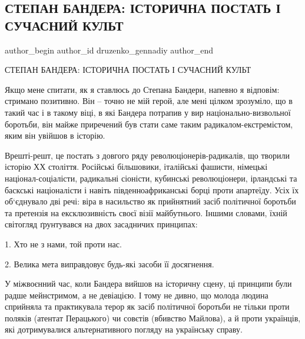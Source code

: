  
 
 
 
 
 
\subsection{СТЕПАН БАНДЕРА: ІСТОРИЧНА ПОСТАТЬ І СУЧАСНИЙ КУЛЬТ}
\label{sec:02_01_2022.fb.druzenko_gennadiy.1.bandera}
 
\ifcmt
 author_begin
   author_id druzenko_gennadiy
 author_end
\fi

СТЕПАН БАНДЕРА: ІСТОРИЧНА ПОСТАТЬ І СУЧАСНИЙ КУЛЬТ

Якщо мене спитати, як я ставлюсь до Степана Бандери, напевно я відповім:
стримано позитивно. Він – точно не мій герой, але мені цілком зрозуміло, що в
такий час і в такому віці, в які Бандера потрапив у вир національно-визвольної
боротьби, він майже приречений був стати саме таким радикалом-екстремістом,
яким він увійшов в історію. 


Врешті-решт, це постать з довгого ряду революціонерів-радикалів, що творили
історію ХХ століття. Російські більшовики, італійські фашисти, німецькі
націонал-соціалісти, радикальні сіоністи, кубинські революціонери, ірландські
та баскські націоналісти і навіть південноафриканські борці проти апартеїду.
Усіх їх об‘єднувало дві речі: віра в насильство як прийнятний засіб політичної
боротьби та претензія на ексклюзивність своєї візії  майбутнього. Іншими
словами, їхній світогляд ґрунтувався на двох засадничих  принципах:

1. Хто не з нами, той проти нас.

2. Велика мета виправдовує будь-які засоби її досягнення.

У міжвоєнний час, коли Бандера вийшов на історичну сцену, ці принципи були
радше мейнстримом, а не девіацією. І тому не дивно, що молода людина сприйняла
та практикувала терор як засіб політичної боротьби не тільки проти поляків
(атентат Перацького) чи совєтів (вбивство Майлова), а й проти українців, які
дотримувалися альтернативного погляду на українську справу. 

